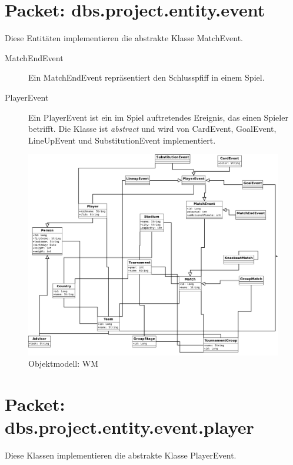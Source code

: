 \documentclass[11pt,german]{scrartcl}
\begin{document}
\section{Packet: dbs.project.entity.event}
Diese Entitäten implementieren die abstrakte Klasse MatchEvent.

\begin{description}

\item [MatchEndEvent]
Ein MatchEndEvent repräsentiert den Schlusspfiff in einem Spiel.

\item [PlayerEvent]
Ein PlayerEvent ist ein im Spiel auftretendes Ereignis, das einen Spieler betrifft. Die Klasse ist {\it abstract} und wird von CardEvent, GoalEvent, LineUpEvent und SubstitutionEvent implementiert.

\end{description}

\begin{figure}[htb]
\begin{center}
\leavevmode
\includegraphics[height=0.75\textheight,angle=90]{../diagrams/objektdiagramm_entity.pdf}
\end{center}
\caption{Objektmodell: WM}
\label{fig:entities}
\end{figure}



\section{Packet: dbs.project.entity.event.player}
Diese Klassen implementieren die abstrakte Klasse PlayerEvent.
\end{document}
